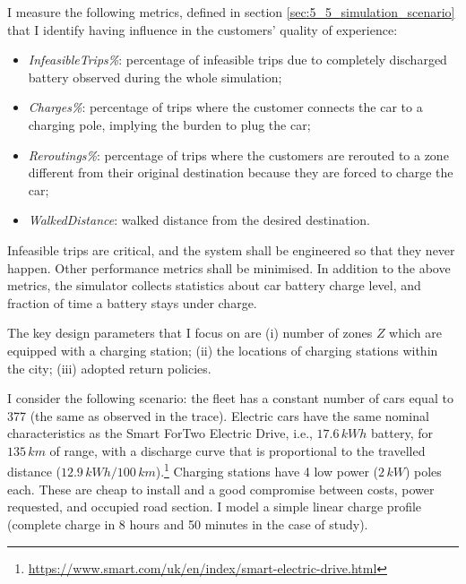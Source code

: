 I measure the following metrics, defined in section \ref{sec:5_5_simulation_scenario} that I identify having influence in the customers' quality of experience:
\begin{itemize}
	\item \textit{InfeasibleTrips\%}: percentage of infeasible trips due to completely discharged battery observed during the whole simulation;  
	\item \textit{Charges\%}: percentage of trips where the customer connects the car to a charging pole, implying the burden to plug the car;
	\item \textit{Reroutings\%}: percentage of trips where the customers are rerouted to a zone different from their original destination because they are forced to charge the car;
	\item \textit{WalkedDistance}: walked distance from the desired destination.
\end{itemize}

Infeasible trips are critical, and the system shall be engineered so that they never happen. Other performance metrics shall be minimised. 
In addition to the above metrics, the simulator collects statistics about car battery charge level, and fraction of time a battery stays under charge. 

The key design parameters that I focus on are (i) number of zones $Z$ which are equipped with a charging station; (ii) the locations of charging stations within the city; (iii) adopted return policies.

I consider the following scenario: the fleet has a constant number of cars equal to 377 (the same as observed in the trace).  Electric cars have the same nominal characteristics as the Smart ForTwo Electric Drive, i.e., $17.6\,kWh$ battery, for $135\,km$ of range, with a discharge curve that is proportional to the travelled distance ($12.9\,kWh/100\,km$).\footnote{\url{https://www.smart.com/uk/en/index/smart-electric-drive.html}} 
Charging stations have 4 low power ($2\,kW$) poles each. These are cheap to install and a good compromise between costs, power requested, and occupied road section. I model a simple linear charge profile (complete charge in 8 hours and 50 minutes in the case of study).


